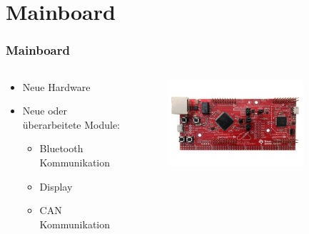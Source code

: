 \section{Mainboard}

\begin{frame}
	\frametitle{Mainboard}
	
	\begin{columns}
		\begin{column}{0.5\textwidth}
			\begin{itemize}
				\item Neue Hardware
				\item Neue oder überarbeitete Module:
				\begin{itemize}
					\item Bluetooth Kommunikation
					\item Display
					\item CAN Kommunikation
				\end{itemize}
			\end{itemize}
		\end{column}
	
		\begin{column}{0.5\textwidth}
			\begin{figure}
				\includegraphics[width=0.8\textwidth]{../images/tiva_tm4c1294xl_ek.jpg}
			\end{figure}
		\end{column}
	\end{columns}
\end{frame}

